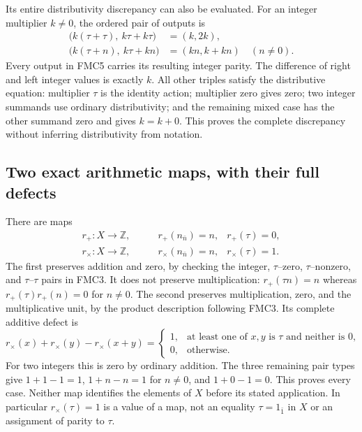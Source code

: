 Its entire distributivity discrepancy can also be evaluated.
For an integer multiplier $k\ne0$, the ordered pair of outputs is
\begin{equation}\tag{FMC5}
\begin{aligned}
\bigl(k(\tau+\tau),\ k\tau+k\tau\bigr)&=(k,2k),\\
\bigl(k(\tau+n),\ k\tau+kn\bigr)&=(kn,k+kn)\quad(n\ne0).
\end{aligned}
\end{equation}
Every output in FMC5 carries its resulting integer parity.
The difference of right and left integer values is exactly $k$.
All other triples satisfy the distributive equation: multiplier
$\tau$ is the identity action; multiplier zero gives zero;
two integer summands use ordinary distributivity; and the remaining
mixed case has the other summand zero and gives $k=k+0$.
This proves the complete discrepancy without inferring distributivity
from notation.

\subsection{Two exact arithmetic maps, with their full defects}
There are maps
\begin{equation}\tag{FMC6}
\begin{aligned}
r_+:X\to\mathbb Z,&\qquad r_+(n_{\bar n})=n,&r_+(\tau)=0,\\
r_\times:X\to\mathbb Z,&\qquad r_\times(n_{\bar n})=n,&r_\times(\tau)=1.
\end{aligned}
\end{equation}
The first preserves addition and zero, by checking the integer,
$\tau$--zero, $\tau$--nonzero, and $\tau$--$\tau$ pairs in FMC3.
It does not preserve multiplication: $r_+(\tau n)=n$ whereas
$r_+(\tau)r_+(n)=0$ for $n\ne0$.
The second preserves multiplication, zero, and the multiplicative
unit, by the product description following FMC3. Its complete
additive defect is
\begin{equation}\tag{FMC7}
r_\times(x)+r_\times(y)-r_\times(x+y)
=\begin{cases}
1,&\text{at least one of $x,y$ is $\tau$ and neither is $0$},\\
0,&\text{otherwise}.
\end{cases}
\end{equation}
For two integers this is zero by ordinary addition. The three
remaining pair types give $1+1-1=1$, $1+n-n=1$ for $n\ne0$,
and $1+0-1=0$. This proves every case.
Neither map identifies the elements of $X$ before its stated
application. In particular $r_\times(\tau)=1$ is a value of a map,
not an equality $\tau=1_{\bar1}$ in $X$ or an assignment of parity
to $\tau$.

